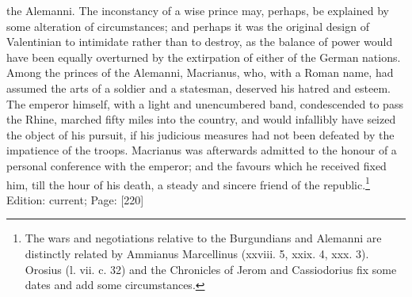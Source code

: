 the Alemanni. The inconstancy of a wise prince may, perhaps, be explained by some alteration of circumstances; and perhaps it was the original design of Valentinian to intimidate rather than to destroy, as the balance of power would have been equally overturned by the extirpation of either of the German nations. Among the princes of the Alemanni, Macrianus, who, with a Roman name, had assumed the arts of a soldier and a statesman, deserved his hatred and esteem. The emperor himself, with a light and unencumbered band, condescended to pass the Rhine, marched fifty miles into the country, and would infallibly have seized the object of his pursuit, if his judicious measures had not been defeated by the impatience of the troops. Macrianus was afterwards admitted to the honour of a personal conference with the emperor; and the favours which he received fixed him, till the hour of his death, a steady and sincere friend of the republic.\footnote{The wars and negotiations relative to the Burgundians and Alemanni are distinctly related by Ammianus Marcellinus (xxviii. 5, xxix. 4, xxx. 3). Orosius (l. vii. c. 32) and the Chronicles of Jerom and Cassiodorius fix some dates and add some circumstances.}
Edition: current; Page: [220]

